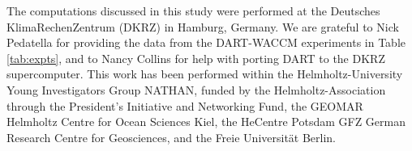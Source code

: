 The computations discussed in this study were performed at the Deutsches KlimaRechenZentrum (DKRZ) in Hamburg, Germany.
We are grateful to Nick Pedatella for providing the data from the DART-WACCM experiments in Table \ref{tab:expts}, and to
Nancy Collins for help with porting DART to the DKRZ supercomputer.
This work has been performed within the Helmholtz-University Young Investigators Group NATHAN, funded by the Helmholtz-Association through the President's Initiative and Networking Fund, the GEOMAR Helmholtz Centre for Ocean Sciences Kiel, the HeCentre Potsdam GFZ German Research Centre for Geosciences, and the Freie Universit\"at Berlin.

